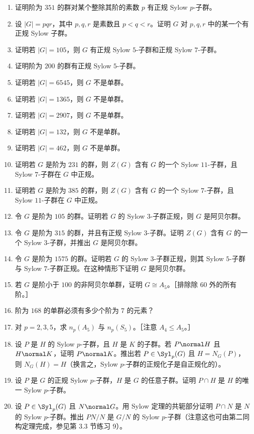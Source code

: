 \begin{enumerate}[label=\arabic*.]
  \item 证明阶为 $351$ 的群对某个整除其阶的素数 $p$ 有正规 Sylow $p$-子群。
  \item 设 $|G|=pqr$，其中 $p,q,r$ 是素数且 $p<q<r$。证明 $G$ 对 $p,q,r$ 中的某一个有正规 Sylow 子群。
  \item 证明若 $|G|=105$，则 $G$ 有正规 Sylow $5$-子群和正规 Sylow $7$-子群。
  \item 证明阶为 $200$ 的群有正规 Sylow $5$-子群。
  \item 证明若 $|G|=6545$，则 $G$ 不是单群。
  \item 证明若 $|G|=1365$，则 $G$ 不是单群。
  \item 证明若 $|G|=2907$，则 $G$ 不是单群。
  \item 证明若 $|G|=132$，则 $G$ 不是单群。
  \item 证明若 $|G|=462$，则 $G$ 不是单群。
  \item 证明若 $G$ 是阶为 $231$ 的群，则 $Z(G)$ 含有 $G$ 的一个 Sylow $11$-子群，且 Sylow $7$-子群在 $G$ 中正规。
  \item 证明若 $G$ 是阶为 $385$ 的群，则 $Z(G)$ 含有 $G$ 的一个 Sylow $7$-子群，且 Sylow $11$-子群在 $G$ 中正规。
  \item 令 $G$ 是阶为 $105$ 的群。证明若 $G$ 的 Sylow $3$-子群正规，则 $G$ 是阿贝尔群。
  \item 令 $G$ 是阶为 $315$ 的群，并且有正规 Sylow $3$-子群。证明 $Z(G)$ 含有 $G$ 的一个 Sylow $3$-子群，并推出 $G$ 是阿贝尔群。
  \item 令 $G$ 是阶为 $1575$ 的群。证明若 $G$ 的 Sylow $3$-子群正规，则其 Sylow $5$-子群与 Sylow $7$-子群正规。在这种情形下证明 $G$ 是阿贝尔群。
  \item 若 $G$ 是阶小于 $100$ 的非阿贝尔单群，证明 $G\cong A_5$。［排除除 $60$ 外的所有阶。］
  \item 阶为 $168$ 的单群必须有多少个阶为 $7$ 的元素？
  \item 对 $p=2,3,5$，求 $n_p(A_5)$ 与 $n_p(S_5)$。［注意 $A_4\leq A_5$。］
  \item 设 $P$ 是 $H$ 的 Sylow $p$-子群，且 $H$ 是 $K$ 的子群。若 $P\normal H$ 且 $H\normal K$，证明 $P\normal K$。推出若 $P\in\Syl_p(G)$ 且 $H=N_G(P)$，则 $N_G(H)=H$（换言之，Sylow $p$-子群的正规化子是自正规化的）。
  \item 设 $P$ 是 $G$ 的正规 Sylow $p$-子群，$H$ 是 $G$ 的任意子群。证明 $P\cap H$ 是 $H$ 的唯一 Sylow $p$-子群。
  \item 设 $P\in\Syl_p(G)$ 且 $N\normal G$。用 Sylow 定理的共轭部分证明 $P\cap N$ 是 $N$ 的 Sylow $p$-子群。推出 $PN/N$ 是 $G/N$ 的 Sylow $p$-子群（注意这也可由第二同构定理完成，参见第 3.3 节练习 9）。

\end{enumerate}
